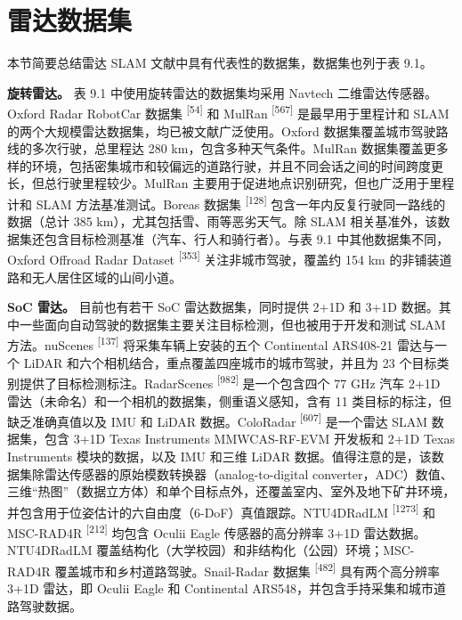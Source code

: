 \section{雷达数据集}

本节简要总结雷达 SLAM 文献中具有代表性的数据集，数据集也列于表 9.1。

\textbf{旋转雷达。} 表 9.1 中使用旋转雷达的数据集均采用 Navtech 二维雷达传感器。Oxford Radar RobotCar 数据集 \textsuperscript{[54]} 和 MulRan \textsuperscript{[567]} 是最早用于里程计和 SLAM 的两个大规模雷达数据集，均已被文献广泛使用。Oxford 数据集覆盖城市驾驶路线的多次行驶，总里程达 280 km，包含多种天气条件。MulRan 数据集覆盖更多样的环境，包括密集城市和较偏远的道路行驶，并且不同会话之间的时间跨度更长，但总行驶里程较少。MulRan 主要用于促进地点识别研究，但也广泛用于里程计和 SLAM 方法基准测试。Boreas 数据集 \textsuperscript{[128]} 包含一年内反复行驶同一路线的数据（总计 385 km），尤其包括雪、雨等恶劣天气。除 SLAM 相关基准外，该数据集还包含目标检测基准（汽车、行人和骑行者）。与表 9.1 中其他数据集不同，Oxford Offroad Radar Dataset \textsuperscript{[353]} 关注非城市驾驶，覆盖约 154 km 的非铺装道路和无人居住区域的山间小道。

\textbf{SoC 雷达。} 目前也有若干 SoC 雷达数据集，同时提供 2+1D 和 3+1D 数据。其中一些面向自动驾驶的数据集主要关注目标检测，但也被用于开发和测试 SLAM 方法。nuScenes \textsuperscript{[137]} 将采集车辆上安装的五个 Continental ARS408-21 雷达与一个 LiDAR 和六个相机结合，重点覆盖四座城市的城市驾驶，并且为 23 个目标类别提供了目标检测标注。RadarScenes \textsuperscript{[982]} 是一个包含四个 77 GHz 汽车 2+1D 雷达（未命名）和一个相机的数据集，侧重语义感知，含有 11 类目标的标注，但缺乏准确真值以及 IMU 和 LiDAR 数据。ColoRadar \textsuperscript{[607]} 是一个雷达 SLAM 数据集，包含 3+1D Texas Instruments MMWCAS-RF-EVM 开发板和 2+1D Texas Instruments 模块的数据，以及 IMU 和三维 LiDAR 数据。值得注意的是，该数据集除雷达传感器的原始模数转换器（analog-to-digital converter，ADC）数值、三维“热图”（数据立方体）和单个目标点外，还覆盖室内、室外及地下矿井环境，并包含用于位姿估计的六自由度（6-DoF）真值跟踪。NTU4DRadLM \textsuperscript{[1273]} 和 MSC-RAD4R \textsuperscript{[212]} 均包含 Oculii Eagle 传感器的高分辨率 3+1D 雷达数据。NTU4DRadLM 覆盖结构化（大学校园）和非结构化（公园）环境；MSC-RAD4R 覆盖城市和乡村道路驾驶。Snail-Radar 数据集 \textsuperscript{[482]} 具有两个高分辨率 3+1D 雷达，即 Oculii Eagle 和 Continental ARS548，并包含手持采集和城市道路驾驶数据。

